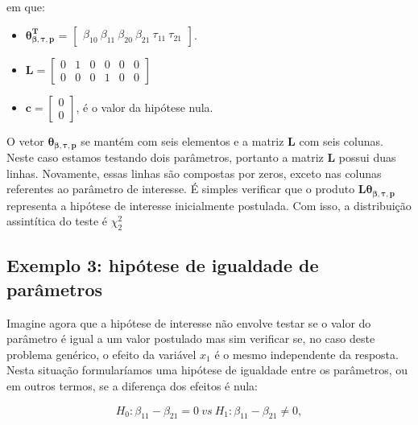 \noindent em que:

\begin{itemize}
  
  \item $\boldsymbol{\theta_{\beta,\tau,p}^T}$ = $\begin{bmatrix} \beta_{10} \  \beta_{11} \ \beta_{20} \ \beta_{21} \ \tau_{11} \ \tau_{21} \end{bmatrix}$.


\item $\boldsymbol{L} = \begin{bmatrix} 0 & 1 & 0 & 0 & 0 & 0 \\
0 & 0 & 0 & 1 & 0 & 0 \end{bmatrix}$
 
\item $\boldsymbol{c} = \begin{bmatrix} 0 \\ 0 \end{bmatrix}$, é o valor da hipótese nula. 

\end{itemize}

O vetor $\boldsymbol{\theta_{\beta,\tau,p}}$ se mantém com seis elementos e a matriz $\boldsymbol{L}$ com seis colunas. Neste caso estamos testando dois parâmetros, portanto a matriz $\boldsymbol{L}$ possui duas linhas. Novamente, essas linhas são compostas por zeros, exceto nas colunas referentes ao parâmetro de interesse. É simples verificar que o produto $\boldsymbol{L}\boldsymbol{\theta_{\beta,\tau,p}}$ representa a hipótese de interesse inicialmente postulada. Com isso, a distribuição assintítica do teste é $\chi^2_2$

\subsection{Exemplo 3: hipótese de igualdade de parâmetros}

Imagine agora que a hipótese de interesse não envolve testar se o valor do parâmetro é igual a um valor postulado mas sim verificar se, no caso deste problema genérico, o efeito da variável $x_1$ é o mesmo independente da resposta. Nesta situação formularíamos uma hipótese de igualdade entre os parâmetros, ou em outros termos, se a diferença dos efeitos é nula:

\begin{equation}
H_0: \beta_{11} - \beta_{21} = 0 \ vs \ H_1: \beta_{11} - \beta_{21} \neq 0,
\end{equation}


